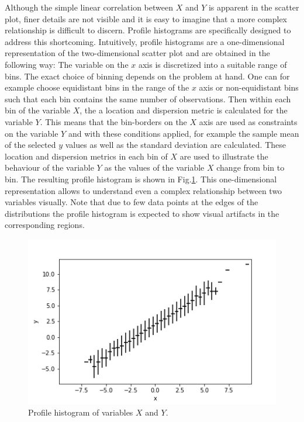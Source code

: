 \documentclass[BCOR=1mm, DIV=calc,10pt,
twoside=true,
twocolumn,
headings=normal]{scrartcl}
\newcommand{\fig}{Fig.}
\begin{document}
Although the simple linear correlation between $X$ and $Y$ is apparent in the scatter plot, finer details are not visible and it is easy to imagine that a more complex relationship is difficult to discern. Profile histograms are specifically designed to address this shortcoming. Intuitively, profile histograms are a one-dimensional representation of the two-dimensional scatter plot and are obtained  in the following way: The variable on the $x$ axis is discretized into a suitable range of bins. The exact choice of binning depends on the problem at hand. One can for example choose equidistant bins in the range of the $x$ axis or non-equidistant bins such that each bin contains the same number of observations. Then within each bin of the variable $X$, the a location and dispersion metric is calculated for the variable $Y$. This means that the bin-borders on the $X$ axis are used as constraints on the variable $Y$ and with these conditions applied, for example the sample mean of the selected $y$ values as well as the standard deviation are calculated. These location and dispersion metrics in each bin of $X$ are used to illustrate the behaviour of the variable $Y$ as the values of the variable $X$ change from bin to bin. The resulting profile histogram is shown in \fig \ref{fig:profile}. This one-dimensional representation allows to understand even a complex relationship between two variables visually. Note that due to few data points at the edges of the distributions the profile histogram is expected to show visual artifacts in the corresponding regions.

 \begin{figure}
\begin{center}
\includegraphics[scale=0.5]{../figures/profile}
\caption{\label{fig:profile} Profile histogram of variables $X$ and $Y$.}
\end{center}
\end{figure}
\end{document}
